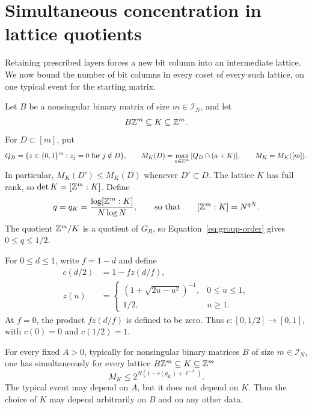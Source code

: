 \section{Simultaneous concentration in lattice quotients}\label{sec:cube}

Retaining prescribed layers forces a new bit column into an intermediate
lattice. We now bound the number of bit columns in every coset of every
such lattice, on one typical event for the starting matrix.

Let \(B\) be a nonsingular binary matrix of size \(m\in\mathcal I_N\), and
let
\[
 B\mathbb Z^m\subseteq K\subseteq\mathbb Z^m.
\]
For \(D\subset[m]\), put
\[
 Q_D=\{z\in\{0,1\}^m:z_j=0\text{ for }j\notin D\},\qquad
 M_K(D)=\max_{a\in\mathbb Z^m}|Q_D\cap(a+K)|,
 \qquad M_K=M_K([m]).
\]
In particular, \(M_K(D')\le M_K(D)\) whenever \(D'\subset D\).
The lattice \(K\) has full rank, so \(\det K=[\mathbb Z^m:K]\). Define
\[
 q=q_K=\frac{\log[\mathbb Z^m:K]}{N\log N},
 \qquad\text{so that}\qquad [\mathbb Z^m:K]=N^{qN}.
\]
The quotient \(\mathbb Z^m/K\) is a quotient of \(G_B\), so
Equation~\eqref{eq:group-order} gives \(0\le q\le1/2\).

For \(0\le d\le1\), write \(f=1-d\) and define
\begin{equation}\label{eq:cube-profile}
 \begin{split}
 c(d/2)&=1-fz(d/f),\\
 z(u)&=
 \begin{cases}
 (1+\sqrt{2u-u^2})^{-1},&0\le u\le1,\\
 1/2,&u\ge1.
 \end{cases}
 \end{split}
\end{equation}
At \(f=0\), the product \(fz(d/f)\) is defined to be zero. Thus
\(c:[0,1/2]\to[0,1]\), with \(c(0)=0\) and \(c(1/2)=1\).

\begin{proposition}\label{prop:cube-concentration}
For every fixed \(A>0\), typically for nonsingular binary matrices \(B\)
of size \(m\in\mathcal I_N\), one has simultaneously for every lattice
\(B\mathbb Z^m\subseteq K\subseteq\mathbb Z^m\)
\begin{equation}\label{eq:cube-concentration}
 M_K\le 2^{N(1-c(q_K)+\ell^{-A})}.
\end{equation}
The typical event may depend on \(A\), but it does not depend on \(K\).
Thus the choice of \(K\) may depend arbitrarily on \(B\) and on any
other data.
\end{proposition}


